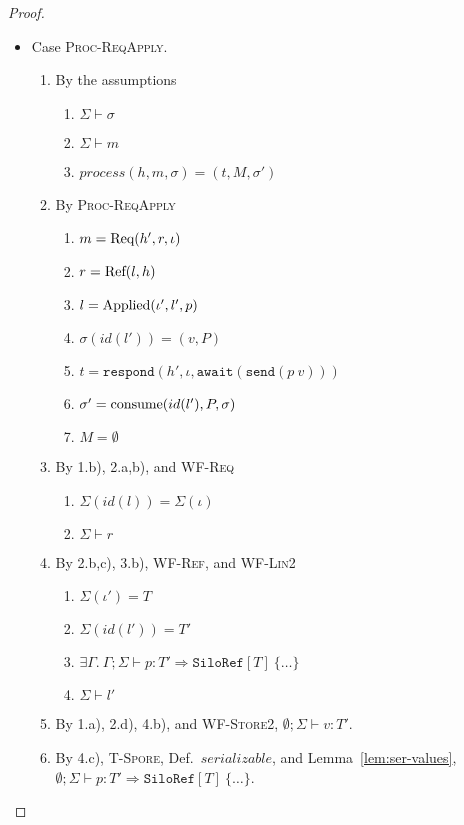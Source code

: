 \begin{proof}
\begin{itemize}
\item Case \textsc{Proc-ReqApply}.
\begin{enumerate}
\item By the assumptions
  \begin{enumerate}[label=(\alph*)]
  \item $\Sigma \vdash \sigma$
  \item $\Sigma \vdash m$
  \item $process(h, m, \sigma) = (t, M, \sigma')$
  \end{enumerate}
\item By \textsc{Proc-ReqApply}
  \begin{enumerate}[label=(\alph*)]
  \item $m = {\textrm{Req}(h', r, \iota)}$
  \item $r = {\textrm{Ref}(l, h)}$
  \item $l = {\textrm{Applied}(\iota', l', p)}$
  \item $\sigma(id(l')) = (v, P)$
  \item $t = \texttt{respond}(h', \iota, \texttt{await}(\texttt{send}(p~v)))$
  \item $\sigma' = {\textrm{consume}(id(l'), P, \sigma)}$
  \item $M = \emptyset$
  \end{enumerate}
\item By 1.b), 2.a,b), and \textsc{WF-Req}
  \begin{enumerate}[label=(\alph*)]
  \item $\Sigma(id(l)) = \Sigma(\iota)$
  \item $\Sigma \vdash r$
  \end{enumerate}
\item By 2.b,c), 3.b), \textsc{WF-Ref}, and \textsc{WF-Lin2}
  \begin{enumerate}[label=(\alph*)]
  \item $\Sigma(\iota') = T$
  \item $\Sigma(id(l')) = T'$
  \item $\exists \Gamma.~\Gamma ; \Sigma \vdash p : T' \Rightarrow \texttt{SiloRef}[T]~\{\ldots\}$
  \item $\Sigma \vdash l'$
  \end{enumerate}
\item By 1.a), 2.d), 4.b), and \textsc{WF-Store2}, $\emptyset ; \Sigma \vdash v : T'$.
\item By 4.c), \textsc{T-Spore}, Def.~$serializable$, and Lemma~\ref{lem:ser-values}, $\emptyset ; \Sigma \vdash p : T' \Rightarrow \texttt{SiloRef}[T]~\{\ldots\}$.

\end{enumerate}
\end{itemize}
\end{proof}
